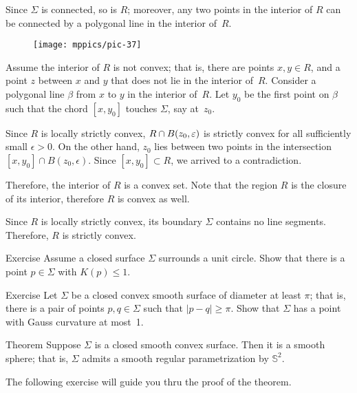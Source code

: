 Since $\Sigma$ is connected, so is $R$;
moreover, any two points in the interior of $R$ can be connected by a polygonal line in the interior of~$R$.

\begin{wrapfigure}{o}{43 mm}
\vskip-0mm
\centering
\texttt{[image: mppics/pic-37]}
\vskip-0mm
\end{wrapfigure}

Assume the interior of $R$ is not convex;
that is, there are points $x,y\in R$, and a point $z$ between $x$ and $y$ that does not lie in the interior of~$R$.
Consider a polygonal  line $\beta$ from $x$ to $y$ in the interior of~$R$.
Let $y_0$ be the first point on $\beta$ such that the chord $[x,y_0]$ touches $\Sigma$, say at~$z_0$.

Since $R$ is locally strictly convex, $R\z\cap B(z_0,\epsilon)$ is strictly convex for all sufficiently small $\epsilon>0$.
On the other hand, $z_0$ lies between two points in the intersection $[x,y_0]\cap B(z_0,\epsilon)$.
Since $[x,y_0]\subset R$, we arrived to a contradiction.

Therefore, the interior of $R$ is a convex set.
Note that the region $R$ is the closure of its interior, therefore $R$ is convex as well.

Since $R$ is locally strictly convex, its boundary $\Sigma$ contains no line segments.
Therefore, $R$ is strictly convex.
\qeds

\begin{thm}{Exercise}\label{ex:surrounds-disc}
Assume a closed surface $\Sigma$ surrounds a unit circle.
Show that there is a point  $p \in \Sigma$ with $K(p)\le 1$. 
\end{thm} 

\begin{thm}{Exercise}\label{ex:small-gauss}
Let $\Sigma$ be a closed convex smooth surface of diameter at least $\pi$;
that is, there is a pair of points $p,q\in\Sigma$ such that $|p-q|\ge \pi$.
Show that $\Sigma$ has a point with Gauss curvature at most~1.
\end{thm}

\begin{thm}{Theorem}\label{thm:convex-closed}
Suppose $\Sigma$ is a closed smooth convex surface.
Then it is a smooth sphere; that is, $\Sigma$ admits a smooth regular parametrization by $\mathbb{S}^2$.\end{thm}

The following exercise will guide you thru the proof of the theorem.

